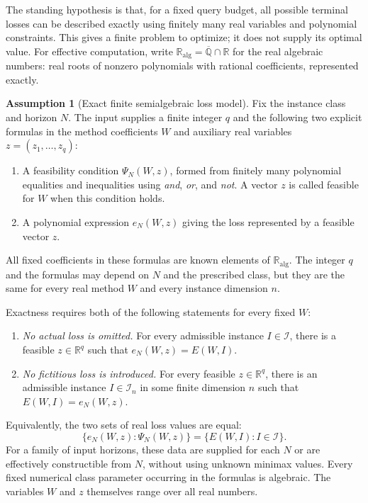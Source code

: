 \documentclass[11pt]{article}
\numberwithin{equation}{section}
\theoremstyle{definition}
\newtheorem{assumption}[theorem]{Assumption}
\newcommand{\R}{\mathbb R}
\newcommand{\K}{\mathbb R_{\mathrm{alg}}}
\begin{document}
The standing hypothesis is that, for a fixed query budget, all possible terminal losses can be described exactly using finitely many real variables and polynomial constraints. This gives a finite problem to optimize; it does not supply its optimal value. For effective computation, write $\K=\overline{\mathbb Q}\cap\R$ for the real algebraic numbers: real roots of nonzero polynomials with rational coefficients, represented exactly.

\begin{assumption}[Exact finite semialgebraic loss model]\label{ass:finite}
Fix the instance class and horizon $N$. The input supplies a finite integer $q$ and the following two explicit formulas in the method coefficients $W$ and auxiliary real variables $z=(z_1,\ldots,z_q)$:
\begin{enumerate}[label=(\roman*),leftmargin=2.3em,itemsep=2pt]
\item A feasibility condition $\Psi_N(W,z)$, formed from finitely many polynomial equalities and inequalities using \emph{and}, \emph{or}, and \emph{not}. A vector $z$ is called feasible for $W$ when this condition holds.
\item A polynomial expression $e_N(W,z)$ giving the loss represented by a feasible vector $z$.
\end{enumerate}
All fixed coefficients in these formulas are known elements of $\K$. The integer $q$ and the formulas may depend on $N$ and the prescribed class, but they are the same for every real method $W$ and every instance dimension $n$.

Exactness requires both of the following statements for every fixed $W$:
\begin{enumerate}[label=(\alph*),leftmargin=2.3em,itemsep=2pt]
\item \emph{No actual loss is omitted.} For every admissible instance $I\in\mathscr I$, there is a feasible $z\in\R^q$ such that $e_N(W,z)=E(W,I)$.
\item \emph{No fictitious loss is introduced.} For every feasible $z\in\R^q$, there is an admissible instance $I\in\mathscr I_n$ in some finite dimension $n$ such that $E(W,I)=e_N(W,z)$.
\end{enumerate}
Equivalently, the two sets of real loss values are equal:
\begin{equation}
 \{e_N(W,z):\Psi_N(W,z)\}
 =
 \{E(W,I):I\in\mathscr I\}.
 \label{eq:loss-model}
\end{equation}
For a family of input horizons, these data are supplied for each $N$ or are effectively constructible from $N$, without using unknown minimax values. Every fixed numerical class parameter occurring in the formulas is algebraic. The variables $W$ and $z$ themselves range over all real numbers.
\end{assumption}
\end{document}
